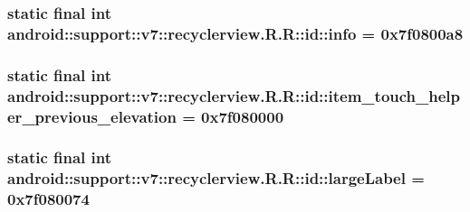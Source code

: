 \hypertarget{classandroid_1_1support_1_1v7_1_1recyclerview_1_1_r_1_1id_8a765bcad0126a8c21ed4d0f99f4e0f6}{
\subsubsection[{info}]{\setlength{\rightskip}{0pt plus 5cm}static final int android::support::v7::recyclerview.R.R::id::info = 0x7f0800a8}}
\label{classandroid_1_1support_1_1v7_1_1recyclerview_1_1_r_1_1id_8a765bcad0126a8c21ed4d0f99f4e0f6}


\hypertarget{classandroid_1_1support_1_1v7_1_1recyclerview_1_1_r_1_1id_9c5af1630abe9ca192ece24e2797e492}{
\subsubsection[{item\_\-touch\_\-helper\_\-previous\_\-elevation}]{\setlength{\rightskip}{0pt plus 5cm}static final int android::support::v7::recyclerview.R.R::id::item\_\-touch\_\-helper\_\-previous\_\-elevation = 0x7f080000}}
\label{classandroid_1_1support_1_1v7_1_1recyclerview_1_1_r_1_1id_9c5af1630abe9ca192ece24e2797e492}


\hypertarget{classandroid_1_1support_1_1v7_1_1recyclerview_1_1_r_1_1id_f4844b720eff83345a2dea0e2850645c}{
\subsubsection[{largeLabel}]{\setlength{\rightskip}{0pt plus 5cm}static final int android::support::v7::recyclerview.R.R::id::largeLabel = 0x7f080074}}
\label{classandroid_1_1support_1_1v7_1_1recyclerview_1_1_r_1_1id_f4844b720eff83345a2dea0e2850645c}


